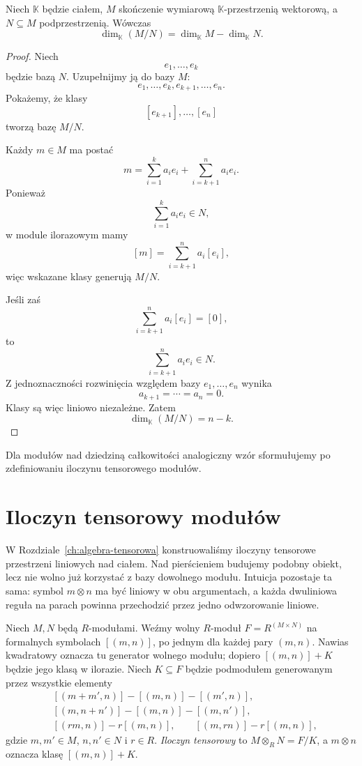 \begin{stwierdzenie}
\label{prop:wymiar-ilorazu}
Niech $\mathbb K$ będzie ciałem, $M$ skończenie wymiarową
$\mathbb K$-przestrzenią wektorową, a $N\subseteq M$ podprzestrzenią.
Wówczas
\[
\dim_{\mathbb K}(M/N)
=
\dim_{\mathbb K}M-\dim_{\mathbb K}N.
\]
\end{stwierdzenie}

\begin{proof}
Niech
\[
e_1,\ldots,e_k
\]
będzie bazą $N$. Uzupełnijmy ją do bazy $M$:
\[
e_1,\ldots,e_k,e_{k+1},\ldots,e_n.
\]
Pokażemy, że klasy
\[
[e_{k+1}],\ldots,[e_n]
\]
tworzą bazę $M/N$.

Każdy $m\in M$ ma postać
\[
m=
\sum_{i=1}^k a_i e_i
+
\sum_{i=k+1}^n a_i e_i.
\]
Ponieważ
\[
\sum_{i=1}^k a_i e_i\in N,
\]
w module ilorazowym mamy
\[
[m]
=
\sum_{i=k+1}^n a_i[e_i],
\]
więc wskazane klasy generują $M/N$.

Jeśli zaś
\[
\sum_{i=k+1}^n a_i[e_i]=[0],
\]
to
\[
\sum_{i=k+1}^n a_i e_i\in N.
\]
Z jednoznaczności rozwinięcia względem bazy
$e_1,\ldots,e_n$ wynika
\[
a_{k+1}=\cdots=a_n=0.
\]
Klasy są więc liniowo niezależne. Zatem
\[
\dim_{\mathbb K}(M/N)=n-k.
\]
\end{proof}

Dla modułów nad dziedziną całkowitości analogiczny wzór
sformułujemy po zdefiniowaniu iloczynu tensorowego modułów.

\section{Iloczyn tensorowy modułów}
\label{sec:tensor-modulow-algebra}

W Rozdziale~\ref{ch:algebra-tensorowa} konstruowaliśmy iloczyny tensorowe
przestrzeni liniowych nad ciałem. Nad pierścieniem
budujemy podobny obiekt, lecz nie wolno już korzystać
z bazy dowolnego modułu. Intuicja pozostaje ta sama:
symbol $m\otimes n$ ma być liniowy w obu argumentach,
a każda dwuliniowa reguła na parach powinna przechodzić
przez jedno odwzorowanie liniowe.

\begin{definicja}
\label{def:tensor-modulow}
Niech $M,N$ będą $R$-modułami. Weźmy wolny
$R$-moduł $F=R^{(M\times N)}$ na formalnych
symbolach $[(m,n)]$, po jednym dla każdej pary $(m,n)$.
Nawias kwadratowy oznacza tu generator wolnego modułu;
dopiero $[(m,n)]+K$ będzie jego klasą w ilorazie.
Niech $K\subseteq F$ będzie
podmodułem generowanym przez wszystkie elementy
\[
\begin{aligned}
 &[(m+m',n)]-[(m,n)]-[(m',n)],\\
 &[(m,n+n')]-[(m,n)]-[(m,n')],\\
 &[(rm,n)]-r[(m,n)],\qquad [(m,rn)]-r[(m,n)],
\end{aligned}
\]
gdzie $m,m'\in M$, $n,n'\in N$ i $r\in R$.
\emph{Iloczyn tensorowy} to $M\otimes_R N=F/K$,
a $m\otimes n$ oznacza klasę $[(m,n)]+K$.
\end{definicja}

